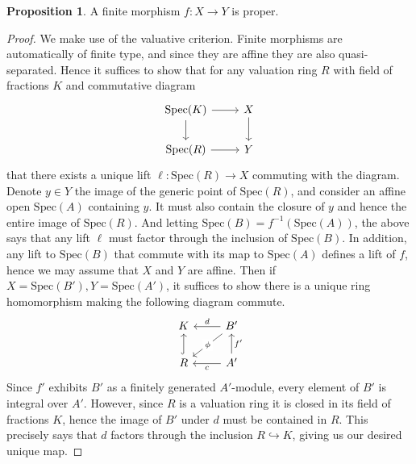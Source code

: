 \documentclass{article}
\theoremstyle{definition}
\newtheorem{proposition}[theorem]{Proposition}
\theoremstyle{remark}
\begin{document}
\begin{proposition}
	A finite morphism $f: X \to Y$ is proper. 
\end{proposition}
\begin{proof}
	We make use of the valuative criterion. 
	Finite morphisms are automatically of finite type, and since they are affine they are also quasi-separated.
	Hence it suffices to show that for any valuation ring $R$ with field of fractions $K$ and commutative diagram
\[\begin{tikzcd}
	{\text{Spec}(K)} & X \\
	{\text{Spec}(R)} & Y
	\arrow[from=1-1, to=1-2]
	\arrow[from=1-1, to=2-1]
	\arrow[from=1-2, to=2-2]
	\arrow[from=2-1, to=2-2]
\end{tikzcd}\]
that there exists a unique lift $\ell: \text{Spec}(R) \to X$ commuting with the diagram.
Denote $y \in Y$ the image of the generic point of $\text{Spec}(R)$, and consider an affine open $\text{Spec}(A)$ containing $y$.
It must also contain the closure of $y$ and hence the entire image of $\text{Spec}(R)$.
And letting $\text{Spec}(B) = f^{-1}(\text{Spec}(A))$, the above says that any lift $\ell$ must factor through the inclusion of $\text{Spec}(B)$.
In addition, any lift to $\text{Spec}(B)$ that commute with its map to $\text{Spec}(A)$ defines a lift of $f$, hence we may assume that $X$ and $Y$ are affine.
Then if $X = \text{Spec}(B'), Y = \text{Spec}(A')$, it suffices to show there is a unique ring homomorphism making the following diagram commute.
\[\begin{tikzcd}
	K & {B'} \\
	R & {A'}
	\arrow["d"', from=1-2, to=1-1]
	\arrow["\phi"{description}, from=1-2, to=2-1]
	\arrow[hook, from=2-1, to=1-1]
	\arrow["{f'}"', from=2-2, to=1-2]
	\arrow["c", from=2-2, to=2-1]
\end{tikzcd}\]
Since $f'$ exhibits $B'$ as a finitely generated $A'$-module, every element of $B'$ is integral over $A'$.
However, since $R$ is a valuation ring it is closed in its field of fractions $K$, hence the image of $B'$ under $d$ must be contained in $R$.
This precisely says that $d$ factors through the inclusion $R \hookrightarrow K$, giving us our desired unique map.
\end{proof}
\end{document}

